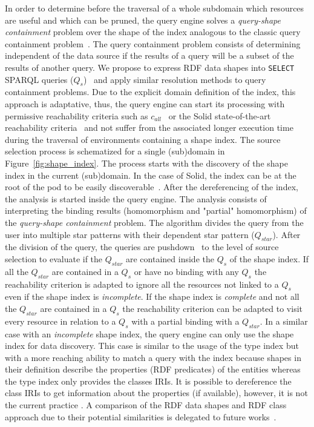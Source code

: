 In order to determine before the traversal of a whole subdomain which resources are useful and which can be pruned, the query engine solves a \emph{query-shape containment} problem over the shape of the index analogous to the classic query containment problem~\cite{afariQCE, Spasi2023, Chekol2018}.
The query containment problem consists of determining independent of the data source if the results of a query will be a subset of the results of another query.
We propose to express RDF data shapes into \texttt{SELECT} SPARQL queries ($Q_{s}$)~\cite{delva2023, spapeExpressionConvert, labragayo2017validating, Corman2019} and apply similar resolution methods to query containment problems.
Due to the explicit domain definition of the index, this approach is adaptative, 
thus, the query engine can start its processing with permissive reachability criteria
such as $c_{all}$~\cite{Hartig2012} or the Solid state-of-the-art reachability criteria~\cite{Taelman2023}
and not suffer from the associated longer execution time during the traversal of environments containing a shape index.
The source selection process is schematized for a single (sub)domain in Figure~\ref{fig:shape_index}.
The process starts with the discovery of the shape index in the current (sub)domain.
In the case of Solid, the index can be at the root of the pod to be easily discoverable~.
After the dereferencing of the index, the analysis is started inside the query engine.
The analysis consists of interpreting the binding results (homomorphism and "partial" homomorphism) of the \emph{query-shape containment} problem.
The algorithm divides the query from the user into multiple star patterns with their dependent star pattern ($Q_{star}$).
After the division of the query, the queries are pushdown~\cite{Stuckenschmidt2004, Yang2021FlexPushdownDBHP} to the level of source selection to evaluate if the $Q_{star}$ are contained inside the $Q_s$ of the shape index.
If all the $Q_{star}$ are contained in a $Q_{s}$ or have no binding with any $Q_{s}$
the reachability criterion is adapted to ignore all the resources not linked to a $Q_{s}$ even if the shape index is \emph{incomplete}.
If the shape index is \emph{complete} and not all the $Q_{star}$ are contained in a $Q_{s}$ the reachability criterion can be adapted
to visit every resource in relation to a $Q_{s}$ with a partial binding with a $Q_{star}$.
In a similar case with an \emph{incomplete} shape index, the query engine can only use the shape index for data discovery.
This case is similar to the usage of the type index but with a more reaching ability to match a query with the index because shapes in their definition describe the properties (RDF predicates) of the entities whereas the type index only provides the classes IRIs.
It is possible to dereference the class IRIs to get information about the properties (if available), however, it is not the current practice \cite{Taelman2023}.
A comparison of the RDF data shapes and RDF class approach due to their potential similarities is delegated to future works~.

